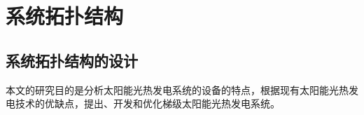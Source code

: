 \chapter{系统拓扑结构}
\label{cha:SystemTopology}
\section{系统拓扑结构的设计}
\label{sec:std}

本文的研究目的是分析太阳能光热发电系统的设备的特点，根据现有太阳能光热发电技术的优缺点，提出、开发和优化梯级太阳能光热发电系统。

